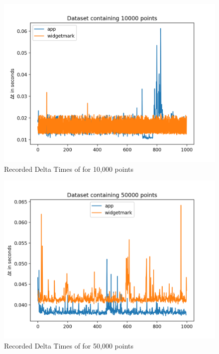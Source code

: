 \begin{figure}[h]
    \centering
    \includegraphics[width=12cm]{resources/img/evaluation/Eval_10000}
    \caption{
        Recorded Delta Times of for 10,000 points
    }
    \label{a:tab:evaluation:10000}
\end{figure}


\begin{figure}[h]
    \centering
    \includegraphics[width=12cm]{resources/img/evaluation/Eval_50000}
    \caption{
        Recorded Delta Times of for 50,000 points
    }
    \label{a:tab:evaluation:50000}
\end{figure}


